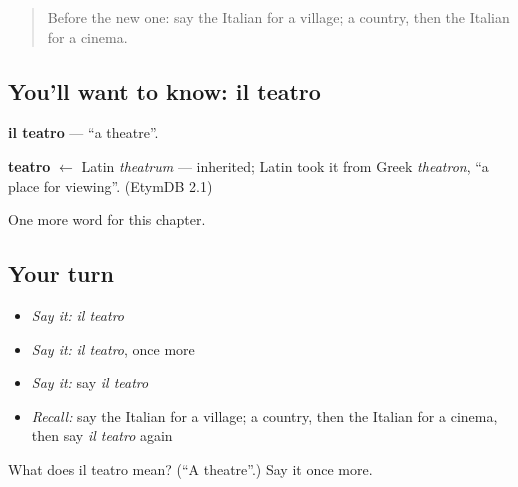 \begin{quote}
Before the new one: say the Italian for a village; a country, then the Italian for a cinema.
\end{quote}

\subsection*{You'll want to know: il teatro}
\textbf{il teatro} — \textquotedblleft{}a theatre\textquotedblright{}.

\begin{cousinweb}
\textbf{teatro} $\leftarrow$ Latin \emph{theatrum} — inherited; Latin took it from Greek \emph{theatron}, \textquotedblleft{}a place for viewing\textquotedblright{}. (EtymDB 2.1)
\end{cousinweb}

\begin{grammarlens}[title={What you've built}]
One more word for this chapter.
\end{grammarlens}

\subsection*{Your turn}
\begin{itemize}
\raggedright
  \item \emph{Say it:} \emph{il teatro}
  \item \emph{Say it:} \emph{il teatro}, once more
  \item \emph{Say it:} say \emph{il teatro}
  \item \emph{Recall:} say the Italian for a village; a country, then the Italian for a cinema, then say \emph{il teatro} again
\end{itemize}

\begin{tcolorbox}[breakable,colback=teal!4,colframe=teal!35!black,title={Before you move on}]
What does il teatro mean? (\textquotedblleft{}A theatre\textquotedblright{}.) Say it once more.
\end{tcolorbox}
